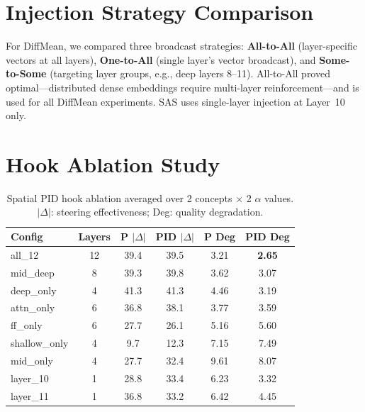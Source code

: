 \documentclass{article}
\theoremstyle{plain}
\begin{document}
\section{Injection Strategy Comparison}
\label{app:injection}

For DiffMean, we compared three broadcast strategies: \textbf{All-to-All} (layer-specific vectors at all layers), \textbf{One-to-All} (single layer's vector broadcast), and \textbf{Some-to-Some} (targeting layer groups, e.g., deep layers 8--11). All-to-All proved optimal---distributed dense embeddings require multi-layer reinforcement---and is used for all DiffMean experiments. SAS uses single-layer injection at Layer~10 only.

\section{Hook Ablation Study}
\label{app:hook_ablation}

\begin{table}[h]
  \caption{Spatial PID hook ablation averaged over 2 concepts $\times$ 2 $\alpha$ values. $|\Delta|$: steering effectiveness; Deg: quality degradation.}
  \label{tab:hook_ablation}
  \begin{center}
  \begin{small}
  \begin{tabular}{lccccc}
    \toprule
    Config & Layers & P $|\Delta|$ & PID $|\Delta|$ & P Deg & PID Deg \\
    \midrule
    all\_12 & 12 & 39.4 & 39.5 & 3.21 & \textbf{2.65} \\
    mid\_deep & 8 & 39.3 & 39.8 & 3.62 & 3.07 \\
    deep\_only & 4 & 41.3 & 41.3 & 4.46 & 3.19 \\
    attn\_only & 6 & 36.8 & 38.1 & 3.77 & 3.59 \\
    ff\_only & 6 & 27.7 & 26.1 & 5.16 & 5.60 \\
    shallow\_only & 4 & 9.7 & 12.3 & 7.15 & 7.49 \\
    mid\_only & 4 & 27.7 & 32.4 & 9.61 & 8.07 \\
    layer\_10 & 1 & 28.8 & 33.4 & 6.23 & 3.32 \\
    layer\_11 & 1 & 36.8 & 33.2 & 6.42 & 4.45 \\
    \bottomrule
  \end{tabular}
  \end{small}
  \end{center}
\end{table}
\end{document}
